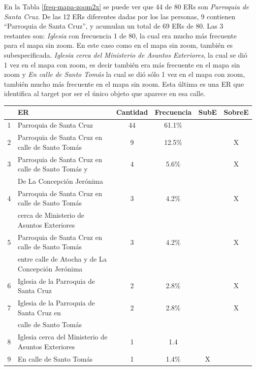 En la Tabla \ref{freq-mapa-zoom2x} se puede ver que 44 de 80 ERs son {\it Parroquia de Santa Cruz}. De las 12 ERs diferentes dadas por los las personas, 9 contienen ``Parroquia de Santa Cruz'', y acumulan un total de 69 ERs de 80. Las 3 restantes son: {\it Iglesia} con frecuencia 1 de 80, la cual era mucho m\'as frecuente para el mapa sin zoom. En este caso como en el mapa sin zoom, tambi\'en es subespecificada. {\it Iglesia cerca del Ministerio de Asuntos Exteriores}, la cual se di\'o 1 vez en el mapa con zoom, es decir tambi\'en era m\'as frecuente en el mapa sin zoom y {\it En calle de Santo Tom\'as} la cual se di\'o s\'olo 1 vez en el mapa con zoom, tambi\'en mucho m\'as frecuente en el mapa sin zoom. Esta \'ultima es una ER que identifica al target por ser el \'unico objeto que aparece en esa calle.

\begin{table}[H]
{\footnotesize
\begin{center}
\begin{tabular}{|l|l|c|c|c|c|}
\hline
&ER 					      & Cantidad &  Frecuencia & SubE&SobreE \\ \hline \hline
1&Parroquia de Santa Cruz        												 &		44&	61.1\%  &  & \\ \hline
2&Parroquia de Santa Cruz en calle de Santo Tom\'as        &    9 &	12.5\%	& &X\\ \hline
3&Parroquia de Santa Cruz en calle de Santo Tom\'as y      &    4 &     5.6\%      & &X\\
&De La Concepci\'on Jer\'onima                             &      &             & & \\ \hline
4&Parroquia de Santa Cruz en calle de Santo Tom\'as        &    3 &     4.2\%      &&X\\
&cerca de Ministerio de Asuntos Exteriores                 &      &             & &\\  \hline
5&Parroquia de Santa Cruz en calle de Santo Tom\'as        &	3 &	4.2\%	& &X\\
&entre calle de Atocha y de La Concepci\'on Jer\'onima     &	  &			&  &\\  \hline
6&Iglesia de la Parroquia de Santa Cruz			   &	2 &	2.8\%	&&X\\  \hline
7&Iglesia de la Parroquia de Santa Cruz	en      	   &	2 &	2.8\%	&&X\\  
&calle de Santo Tom\'as													 				 &		 &	    &  & \\ \hline
8&Iglesia cerca del Ministerio de Asuntos Exteriores       &	1 &	1.4	&&\\  \hline
9&En calle de Santo Tom\'as                                   &    1 &     1.4\%      &X&\\  \hline


\end{tabular}
\end{center}}
\end{table}

